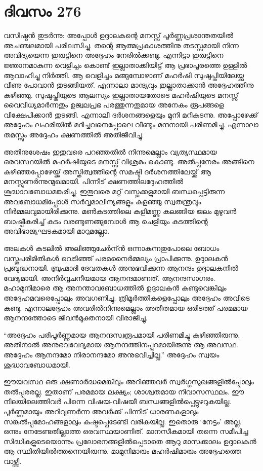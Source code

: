 \section{ദിവസം 276}


വസിഷ്ഠന്‍ തുടര്‍ന്നു: അപ്പോള്‍ ഉദ്ദാലകന്റെ മനസ്സ് പൂര്‍ണ്ണപ്രശാന്തതയില്‍ അചഞ്ചലമായി പരിലസിച്ചു. തന്റെ ആത്മപ്രകാശത്തിനു തടസ്സമായി നിന്ന അവിദ്യയെന്ന ഇരുട്ടിനെ അദ്ദേഹം നേരില്‍ക്കണ്ടു. എന്നിട്ടാ ഇരുട്ടിനെ ജ്ഞാനമാകുന്ന വെളിച്ചം കൊണ്ട് ഇല്ലാതാക്കിയിട്ട് ആ പ്രഭാപൂരത്തെ ഉള്ളില്‍ ആവാഹിച്ചു നിര്‍ത്തി. ആ വെളിച്ചം മങ്ങുമ്പോഴാണ് മഹര്‍ഷി സുഷുപ്തിയിലേയ്ക്കു വീണു പോവാന്‍ തുടങ്ങിയത്. എന്നാലാ മാന്ദ്യവും ഇല്ലാതാക്കാന്‍ അദ്ദേഹത്തിനു കഴിഞ്ഞു. സുഷുപ്തിയുടെ ആലസ്യം ഇല്ലാതായതോടെ മഹര്‍ഷിയുടെ മനസ്സ് വൈവിധ്യമാര്‍ന്നതും ഉജ്വലപ്രഭ പരത്തുന്നതുമായ അനേകം രൂപങ്ങളെ വിക്ഷേപിക്കാന്‍ തുടങ്ങി. എന്നാലീ ദര്‍ശനങ്ങളെയും മുനി മറികടന്നു. അപ്പോഴേക്ക് അദ്ദേഹം ലഹരിയില്‍ മദിച്ചവനെപ്പോലെ വീണ്ടും മന്ദനായി പരിണമിച്ചു. എന്നാലാ തമസ്സും അദ്ദേഹം ക്ഷണത്തില്‍  അതിജീവിച്ചു. 

അതിനുശേഷം ഇതുവരെ പറഞ്ഞതില്‍ നിന്നുമെല്ലാം വ്യത്യസ്ഥമായ ഒരവസ്ഥയില്‍ മഹര്‍ഷിയുടെ മനസ്സ് വിശ്രമം കൊണ്ടു. അല്‍പ്പനേരം അങ്ങിനെ കഴിഞ്ഞപ്പോഴേയ്ക്ക് അസ്തിത്വത്തിന്റെ സമഷ്ടി ദര്‍ശനത്തിലേയ്ക്ക് ആ മനസ്സുണര്‍ന്നുന്മുഖമായി. പിന്നീട് ക്ഷണത്തിലദ്ദേഹത്തില്‍ ശുദ്ധാവബോധമങ്കുരിച്ചു. ഇതുവരെ മറ്റ്‌ വസ്തുക്കളുമായി ബന്ധപ്പെട്ടിരുന്ന അവബോധമിപ്പോള്‍ സര്‍വ്വമാലിന്യങ്ങളും കളഞ്ഞു സ്വതന്ത്രവും നിര്‍മ്മലവുമായിരിക്കുന്നു. മണ്‍കുടത്തിലെ കളിമണ്ണു കലങ്ങിയ ജലം മുഴുവന്‍ ബാഷ്പീകരിച്ച് കുടം വരണ്ടുണങ്ങുമ്പോള്‍ ആ ചെളിയും കുടത്തിന്റെ അവിഭാജ്യഘടകമായി മാറുമല്ലോ.  

അലകള്‍ കടലില്‍ അലിഞ്ഞുചേര്‍ന്ന്‍ ഒന്നാകുന്നതുപോലെ ബോധം വസ്തുപരിമിതികള്‍ വെടിഞ്ഞ് പരമനൈര്‍മ്മല്യം പ്രാപിക്കുന്നു. ഉദ്ദാലകന്‍ പ്രബുദ്ധനായി. ബ്രഹ്മാദി ദേവതകള്‍ അനുഭവിക്കുന്ന ആനന്ദം ഉദ്ദാലകനില്‍ വേദ്യമായി. അനിര്‍വ്വചനീയമായ ആനന്ദമാണത്. ആനന്ദസാഗരം. മഹാമുനിമാരെ ആ അനന്താവബോധത്തില്‍ ഉദ്ദാലകന്‍ കണ്ടുവെങ്കിലും അദ്ദേഹമവരെപ്പോലും അവഗണിച്ചു. ത്രിമൂര്‍ത്തികളെപ്പോലും അദ്ദേഹം അവിടെ കണ്ടു. എന്നാലദ്ദേഹം അവരില്‍നിന്നുമെല്ലാം അതീതമായ ഒരിടത്ത് പരമമായ ആനന്ദത്തോടെ ജീവന്‍മുക്തനായി വിരാജിച്ചു.  

“അദ്ദേഹം പരിപൂര്‍ണ്ണമായ ആനന്ദസ്വരൂപമായി പരിണമിച്ചു കഴിഞ്ഞിരുന്നു. അതിനാല്‍ അനുഭവവേദ്യമായ ആനന്ദത്തിനപ്പുറമായിരുന്നു ആ അവസ്ഥ. അദ്ദേഹം ആനന്ദമോ നിരാനന്ദമോ അനുഭവിച്ചില്ല.” അദ്ദേഹം സ്വയം ശുദ്ധാവബോധമായി.   

ഈയവസ്ഥ ഒരു ക്ഷണാര്‍ദ്ധമെങ്കിലും അറിഞ്ഞവര്‍ സ്വര്‍ഗ്ഗസുഖങ്ങളില്‍പ്പോലും തല്‍പ്പരരല്ല. ഇതാണ് പരമമായ ലക്ഷ്യം; ശാശ്വതമായ നിവാസസ്ഥലം. ഈ നിലയിലെത്തിവര്‍ പിന്നെ വിഷയ-വിഷയീ ബന്ധങ്ങളില്‍പ്പെട്ടുഴറുകയില്ല. പൂര്‍ണ്ണമായും അറിവുണര്‍ന്ന അവര്‍ക്ക് പിന്നീട് ധാരണകളാലും സങ്കല്‍പ്പമോഹങ്ങളാലും കഷ്ടപ്പെടേണ്ടി വരികയില്ല. ഇതൊരു ‘നേട്ടം’ അല്ല. ഒന്നും നേടേണ്ടതില്ലാത്ത ഒരവസ്ഥയാണിത്. മാനസീകമായി തന്നെ സമീപിച്ച സിദ്ധികളുടെയൊന്നും പ്രലോഭനങ്ങളില്‍പ്പെടാതെ ആറു മാസക്കാലം ഉദ്ദാലകന്‍ ആ സ്ഥിതിയില്‍ത്തന്നെയിരുന്നു. മാമുനിമാരും മഹര്‍ഷിമാരും അദ്ദേഹത്തെ വാഴ്ത്തി.

